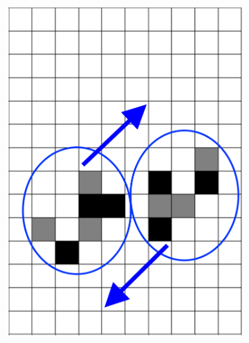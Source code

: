 \documentclass[12pt]{article}
\numberwithin{figure}{section} %
\begin{document}
\begin{figure}[H]
	\centering
	\begin{subfigure}{0.24\textwidth}
     		\centering
     		\includegraphics[width=\linewidth]{Section4/37.0}
     		\subcaption{}
   	\end{subfigure}
    	\begin{subfigure}{0.24\textwidth}
     		\centering

\end{subfigure}
\end{figure}
\end{document}
